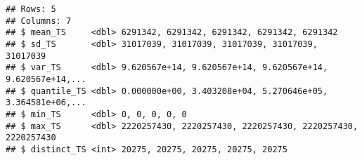 \documentclass[
]{article}
\newenvironment{Shaded}{\begin{snugshade}}{\end{snugshade}}
\newcommand{\CommentTok}[1]{\textcolor[rgb]{0.56,0.35,0.01}{\textit{#1}}}
\newcommand{\DataTypeTok}[1]{\textcolor[rgb]{0.13,0.29,0.53}{#1}}
\newcommand{\KeywordTok}[1]{\textcolor[rgb]{0.13,0.29,0.53}{\textbf{#1}}}
\newcommand{\NormalTok}[1]{#1}
\newcommand{\OperatorTok}[1]{\textcolor[rgb]{0.81,0.36,0.00}{\textbf{#1}}}
\newcommand{\StringTok}[1]{\textcolor[rgb]{0.31,0.60,0.02}{#1}}
\begin{document}
\begin{Shaded}
\end{Shaded}

\begin{verbatim}
## Rows: 5
## Columns: 7
## $ mean_TS     <dbl> 6291342, 6291342, 6291342, 6291342, 6291342
## $ sd_TS       <dbl> 31017039, 31017039, 31017039, 31017039, 31017039
## $ var_TS      <dbl> 9.620567e+14, 9.620567e+14, 9.620567e+14, 9.620567e+14,...
## $ quantile_TS <dbl> 0.000000e+00, 3.403208e+04, 5.270646e+05, 3.364581e+06,...
## $ min_TS      <dbl> 0, 0, 0, 0, 0
## $ max_TS      <dbl> 2220257430, 2220257430, 2220257430, 2220257430, 2220257430
## $ distinct_TS <int> 20275, 20275, 20275, 20275, 20275
\end{verbatim}

\begin{Shaded}
\end{Shaded}
\end{document}
